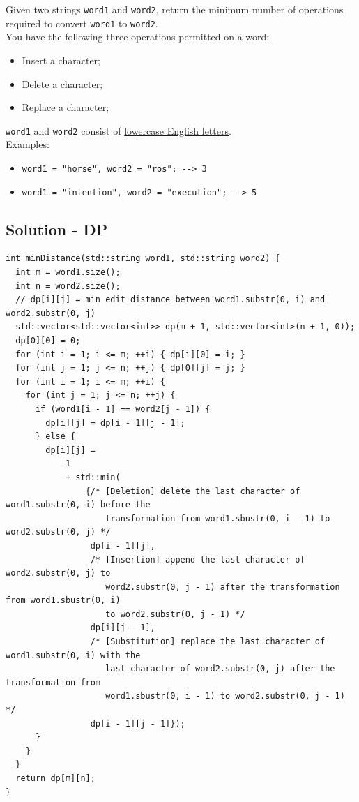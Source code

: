Given two strings {\colorbox{CodeBackground}{\lstinline|word1|}} and {\colorbox{CodeBackground}{\lstinline|word2|}}, return the minimum number of operations required to convert {\colorbox{CodeBackground}{\lstinline|word1|}} to {\colorbox{CodeBackground}{\lstinline|word2|}}.\\

You have the following three operations permitted on a word:
\begin{itemize}
	\item Insert a character;
	\item Delete a character;
	\item Replace a character;
\end{itemize}

{\colorbox{CodeBackground}{\lstinline|word1|}} and {\colorbox{CodeBackground}{\lstinline|word2|}} consist of \ul{lowercase English letters}.\\

Examples:
\begin{itemize}
	\item {\colorbox{CodeBackground}{\lstinline|word1 = "horse", word2 = "ros"; --> 3|}}
	\item {\colorbox{CodeBackground}{\lstinline|word1 = "intention", word2 = "execution"; --> 5|}}
\end{itemize}

\subsection*{Solution - DP}
\begin{lstlisting}
int minDistance(std::string word1, std::string word2) {
  int m = word1.size();
  int n = word2.size();
  // dp[i][j] = min edit distance between word1.substr(0, i) and word2.substr(0, j)
  std::vector<std::vector<int>> dp(m + 1, std::vector<int>(n + 1, 0));
  dp[0][0] = 0;
  for (int i = 1; i <= m; ++i) { dp[i][0] = i; }
  for (int j = 1; j <= n; ++j) { dp[0][j] = j; }
  for (int i = 1; i <= m; ++i) {
    for (int j = 1; j <= n; ++j) {
      if (word1[i - 1] == word2[j - 1]) {
        dp[i][j] = dp[i - 1][j - 1];
      } else {
        dp[i][j] =
            1
            + std::min(
                {/* [Deletion] delete the last character of word1.substr(0, i) before the
                    transformation from word1.sbustr(0, i - 1) to word2.substr(0, j) */
                 dp[i - 1][j],
                 /* [Insertion] append the last character of word2.substr(0, j) to
                    word2.substr(0, j - 1) after the transformation from word1.sbustr(0, i)
                    to word2.substr(0, j - 1) */
                 dp[i][j - 1],
                 /* [Substitution] replace the last character of word1.substr(0, i) with the
                    last character of word2.substr(0, j) after the transformation from
                    word1.sbustr(0, i - 1) to word2.substr(0, j - 1) */
                 dp[i - 1][j - 1]});
      }
    }
  }
  return dp[m][n];
}
\end{lstlisting}

